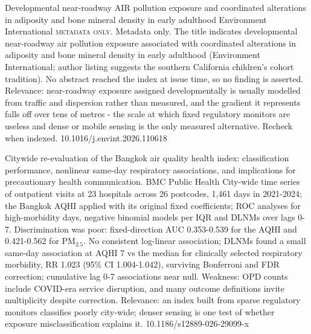 \documentclass[10pt]{article}
\begin{document}
{Developmental near-roadway AIR pollution exposure and coordinated alterations in adiposity and bone mineral density in early adulthood}
{Environment International}
{\textsc{metadata only.} Metadata only. The title indicates developmental near-roadway air pollution exposure associated with coordinated alterations in adiposity and bone mineral density in early adulthood (Environment International; author listing suggests the southern California children's cohort tradition). No abstract reached the index at issue time, so no finding is asserted. Relevance: near-roadway exposure assigned developmentally is usually modelled from traffic and dispersion rather than measured, and the gradient it represents falls off over tens of metres - the scale at which fixed regulatory monitors are useless and dense or mobile sensing is the only measured alternative. Recheck when indexed.}
{10.1016/j.envint.2026.110618}

\par{}\baselineskip{}\baselineskip
{}

{Citywide re-evaluation of the Bangkok air quality health index: classification performance, nonlinear same-day respiratory associations, and implications for precautionary health communication.}
{BMC Public Health}
{City-wide time series of outpatient visits at 23 hospitals across 26 postcodes, 1,461 days in 2021-2024; the Bangkok AQHI applied with its original fixed coefficients; ROC analyses for high-morbidity days, negative binomial models per IQR and DLNMs over lags 0-7. Discrimination was poor: fixed-direction AUC 0.353-0.539 for the AQHI and 0.421-0.562 for PM$_{2.5}$. No consistent log-linear association; DLNMs found a small same-day association at AQHI 7 vs the median for clinically selected respiratory morbidity, RR 1.023 (95\% CI 1.004-1.042), surviving Bonferroni and FDR correction; cumulative lag 0-7 associations near null. Weakness: OPD counts include COVID-era service disruption, and many outcome definitions invite multiplicity despite correction. Relevance: an index built from sparse regulatory monitors classifies poorly city-wide; denser sensing is one test of whether exposure misclassification explains it.}
{10.1186/s12889-026-29099-x}
\end{document}
